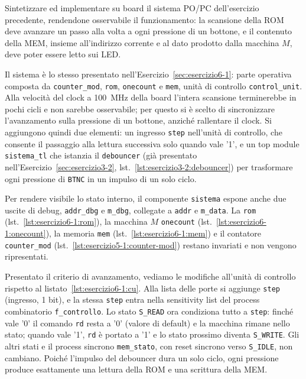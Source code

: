 \label{sec:esercizio6-2}

\begin{traccia}
Sintetizzare ed implementare su board il sistema PO/PC dell'esercizio precedente, rendendone osservabile il funzionamento: la scansione della ROM deve avanzare un passo alla volta a ogni pressione di un bottone, e il contenuto della MEM, insieme all'indirizzo corrente e al dato prodotto dalla macchina $M$, deve poter essere letto sui LED.
\end{traccia}

\progetto

Il sistema è lo stesso presentato nell'Esercizio~\ref{sec:esercizio6-1}: parte operativa composta da \texttt{counter\_mod}, \texttt{rom}, \texttt{onecount} e \texttt{mem}, unità di controllo \texttt{control\_unit}. Alla velocità del clock a \SI{100}{MHz} della board l'intera scansione terminerebbe in pochi cicli e non sarebbe osservabile; per questo si è scelto di sincronizzare l'avanzamento sulla pressione di un bottone, anziché rallentare il clock. Si aggiungono quindi due elementi: un ingresso \texttt{step} nell'unità di controllo, che consente il passaggio alla lettura successiva solo quando vale '1', e un top module \texttt{sistema\_tl} che istanzia il \texttt{debouncer} (già presentato nell'Esercizio~\ref{sec:esercizio3-2}, lst.~\ref{lst:esercizio3-2:debouncer}) per trasformare ogni pressione di \texttt{BTNC} in un impulso di un solo ciclo.

Per rendere visibile lo stato interno, il componente \texttt{sistema} espone anche due uscite di debug, \texttt{addr\_dbg} e \texttt{m\_dbg}, collegate a \texttt{addr} e \texttt{m\_data}. La \texttt{rom} (lst.~\ref{lst:esercizio6-1:rom}), la macchina $M$ \texttt{onecount} (lst.~\ref{lst:esercizio6-1:onecount}), la memoria \texttt{mem} (lst.~\ref{lst:esercizio6-1:mem}) e il contatore \texttt{counter\_mod} (lst.~\ref{lst:esercizio5-1:counter-mod}) restano invariati e non vengono ripresentati.

\implementazione

Presentato il criterio di avanzamento, vediamo le modifiche all'unità di controllo rispetto al listato~\ref{lst:esercizio6-1:cu}. Alla lista delle porte si aggiunge \texttt{step} (ingresso, 1 bit), e la stessa \texttt{step} entra nella sensitivity list del process combinatorio \texttt{f\_controllo}. Lo stato \texttt{S\_READ} ora condiziona tutto a \texttt{step}: finché vale '0' il comando \texttt{rd} resta a '0' (valore di default) e la macchina rimane nello stato; quando vale '1', \texttt{rd} è portato a '1' e lo stato prossimo diventa \texttt{S\_WRITE}. Gli altri stati e il process sincrono \texttt{mem\_stato}, con reset sincrono verso \texttt{S\_IDLE}, non cambiano. Poiché l'impulso del debouncer dura un solo ciclo, ogni pressione produce esattamente una lettura della ROM e una scrittura della MEM.


